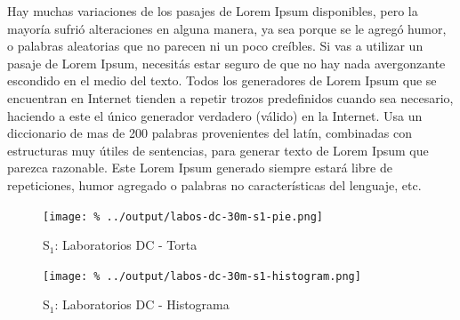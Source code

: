 \documentclass[final,narroweqnarray,inline]{ieee}
\begin{document}
Hay muchas variaciones de los pasajes de Lorem Ipsum disponibles, pero la mayoría sufrió alteraciones en alguna manera, ya sea porque se le agregó humor, o palabras aleatorias que no parecen ni un poco creíbles. Si vas a utilizar un pasaje de Lorem Ipsum, necesitás estar seguro de que no hay nada avergonzante escondido en el medio del texto. Todos los generadores de Lorem Ipsum que se encuentran en Internet tienden a repetir trozos predefinidos cuando sea necesario, haciendo a este el único generador verdadero (válido) en la Internet. Usa un diccionario de mas de 200 palabras provenientes del latín, combinadas con estructuras muy útiles de sentencias, para generar texto de Lorem Ipsum que parezca razonable. Este Lorem Ipsum generado siempre estará libre de repeticiones, humor agregado o palabras no características del lenguaje, etc.

    \begin{figure}[ht]\begin{center}
      \texttt{[image: \%
      ../output/labos-dc-30m-s1-pie.png]}
      \vspace{-2em}
      \caption{S$_1$: Laboratorios DC - Torta}
      \label{labos-dc-30m-s1-pie}
    \end{center}\end{figure}

    \begin{figure}[ht]\begin{center}
      \texttt{[image: \%
      ../output/labos-dc-30m-s1-histogram.png]}
      \caption{S$_1$: Laboratorios DC - Histograma}
      \label{labos-dc-30m-s1-histogram}
    \end{center}\end{figure}

\end{document}
